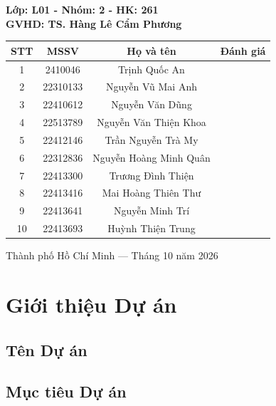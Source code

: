 \documentclass[a4paper,12pt]{article}
\begin{document}
\begin{titlepage}
\begin{center}
\begin{center}
    \textbf{\large Lớp: L01 - Nhóm: 2 - HK: 261}\\
    \textbf{\large GVHD: TS. Hàng Lê Cẩm Phương}
    \vspace{0.2cm}
    \begin{table}[h!]
    \renewcommand{\arraystretch}{1.3}
    \centering
    \small
    \begin{tabular}{|c|c|c|c|}
        \hline
        \textbf{STT} & \textbf{MSSV} & \textbf{Họ và tên} & \textbf{Đánh giá} \\
        \hline
        1 & 2410046 & Trịnh Quốc An & \\
        \hline
        2 & 22310133 & Nguyễn Vũ Mai Anh & \\
        \hline
        3 & 22410612 & Nguyễn Văn Dũng & \\
        \hline
        4 & 22513789 & Nguyễn Văn Thiện Khoa & \\
        \hline
        5 & 22412146 & Trần Nguyễn Trà My & \\
        \hline
        6 & 22312836 & Nguyễn Hoàng Minh Quân & \\
        \hline
        7 & 22413300 & Trương Đình Thiện & \\
        \hline
        8 & 22413416 & Mai Hoàng Thiên Thư & \\
        \hline
        9 & 22413641 & Nguyễn Minh Trí & \\
        \hline
        10 & 22413693 & Huỳnh Thiện Trung & \\
        \hline
    \end{tabular}
\end{table}
\end{center}

{Thành phố Hồ Chí Minh — Tháng 10 năm 2026}

\end{center}
\end{titlepage}
\restoregeometry

\newpage
\pagestyle{fancy}
\tableofcontents
\newpage

\section{Giới thiệu Dự án}
\subsection{Tên Dự án}
\subsection{Mục tiêu Dự án}
\end{document}
